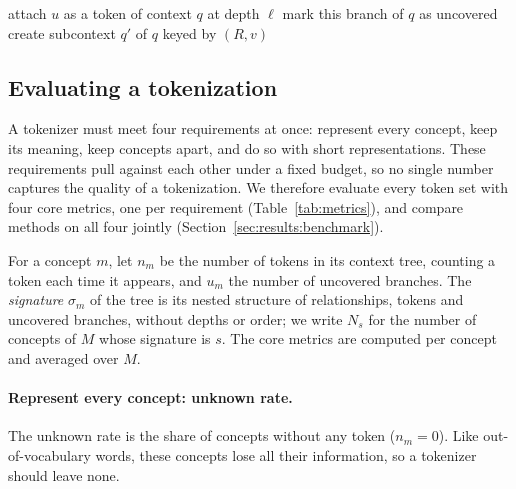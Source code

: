 \begin{algorithm}[t]
\caption{\textsc{Expand}$(u, q, \ell)$: builds the context tree of a concept $m$, called as \textsc{Expand}$(m, q_0, 0)$; $\ell$ counts the hops from $m$.}
\label{alg:expand}
\begin{algorithmic}[1]
     
        \State attach $u$ as a token of context $q$ at depth $\ell$
        \State \Return
    \EndIf
        \State mark this branch of $q$ as uncovered
        \State \Return
    \EndIf
            \State {} 
            \State create subcontext $q'$ of $q$ keyed by $(R, v)$
            \State {}
        \EndIf
    \EndFor
\EndProcedure
\end{algorithmic}
\end{algorithm}

\subsection{Evaluating a tokenization}
\label{sec:method:metrics}

A tokenizer must meet four requirements at once: represent every concept, keep its meaning, keep concepts apart, and do so with short representations.
These requirements pull against each other under a fixed budget, so no single number captures the quality of a tokenization.
We therefore evaluate every token set with four core metrics, one per requirement (Table~\ref{tab:metrics}), and compare methods on all four jointly (Section~\ref{sec:results:benchmark}).

For a concept $m$, let $n_m$ be the number of tokens in its context tree, counting a token each time it appears, and $u_m$ the number of uncovered branches.
The \emph{signature} $\sigma_m$ of the tree is its nested structure of relationships, tokens and uncovered branches, without depths or order; we write $N_s$ for the number of concepts of $M$ whose signature is $s$.
The core metrics are computed per concept and averaged over $M$.

\paragraph{Represent every concept: unknown rate.}
The unknown rate is the share of concepts without any token ($n_m = 0$).
Like out-of-vocabulary words, these concepts lose all their information, so a tokenizer should leave none.

